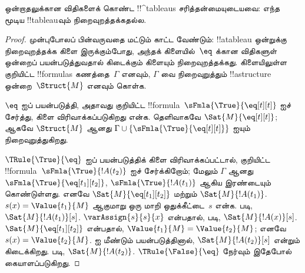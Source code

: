 \documentclass[../../../include/open-logic-section]{subfiles}
\begin{document}


\begin{prop}
ஒன்றாதலுக்கான விதிகளைக் கொண்ட !!^{tableau}s சரித்தன்மையுடையவை: எந்த மூடிய
!!{tableau}வும் நிறைவுறத்தக்கதல்ல.
\end{prop}

\begin{proof}
முன்புபோலப் பின்வருவதை மட்டும் காட்ட வேண்டும்: !!a{tableau} ஒன்றுக்கு
நிறைவுறத்தக்க கிளை இருக்கும்போது, அந்தக் கிளையில்~$\eq$ க்கான விதிகளுள்
ஒன்றைப் பயன்படுத்துவதால் கிடைக்கும் கிளையும் நிறைவுறத்தக்கது. கிளையிலுள்ள
குறியிட்ட !!{formula}s கணத்தை~$\Gamma$ எனவும், $\Gamma$ வை நிறைவுறுத்தும்
!!a{structure} ஒன்றை~$\Struct{M}$ எனவும் கொள்க.

$\eq$ ஐப் பயன்படுத்தி, அதாவது குறியிட்ட
!!{formula}~$\sFmla{\True}{\eq[t][t]}$ ஐச் சேர்த்து, கிளை
விரிவாக்கப்படுகிறது என்க. தெளிவாகவே $\Sat{M}{\eq[t][t]}$; ஆகவே
$\Struct{M}$ ஆனது $\Gamma \cup \{\sFmla{\True}{\eq[t][t]}\}$ ஐயும்
நிறைவுறுத்துகிறது.

$\TRule{\True}{\eq}$ ஐப் பயன்படுத்திக் கிளை விரிவாக்கப்பட்டால், குறியிட்ட
!!{formula}~$\sFmla{\True}{!A(t_2)}$ ஐச் சேர்க்கிறோம்; மேலும் $\Gamma$ ஆனது
$\sFmla{\True}{\eq[t_1][t_2]}$, $\sFmla{\True}{!A(t_1)}$ ஆகிய இரண்டையும்
கொண்டுள்ளது. எனவே $\Sat{M}{\eq[t_1][t_2]}$ மற்றும்
$\Sat{M}{!A(t_1)}$. $s(x) = \Value{t_1}{M}$ ஆகுமாறு ஒரு மாறி
ஒதுக்கீட்டை~$s$ என்க.
 படி,
$\Sat{M}{!A(t_1)}[s]$. $\varAssign{s}{s}{x}$ என்பதால்,
 படி,
$\Sat{M}{!A(x)}[s]$. $\Sat{M}{\eq[t_1][t_2]}$ என்பதால்,
$\Value{t_1}{M} = \Value{t_2}{M}$; எனவே $s(x) = \Value{t_2}{M}$.
 ஐ மீண்டும்
பயன்படுத்தினால், $\Sat{M}{!A(t_2)}[s]$ என்றும் கிடைக்கிறது.
 படி,
$\Sat{M}{!A(t_2)}$. $\TRule{\False}{\eq}$ நேர்வும் இதேபோல்
கையாளப்படுகிறது.
\end{proof}
\end{document}
